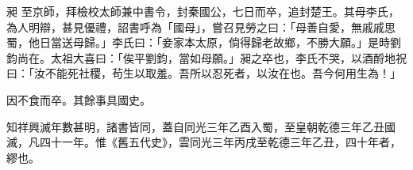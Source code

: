 \begin{pinyinscope}
 昶
 至京師，拜檢校太師兼中書令，封秦國公，七日而卒，追封楚王。其母李氏，為人明辯，甚見優禮，詔書呼為「國母」，嘗召見勞之曰：「母善自愛，無戚戚思蜀，他日當送母歸。」李氏曰：「妾家本太原，倘得歸老故鄉，不勝大願。」是時劉鈞尚在。太祖大喜曰：「俟平劉鈞，當如母願。」昶之卒也，李氏不哭，以酒酹地祝曰：「汝不能死社稷，茍生以取羞。吾所以忍死者，以汝在也。吾今何用生為！」



 因不食而卒。其餘事具國史。



 知祥興滅年數甚明，諸書皆同，蓋自同光三年乙酉入蜀，至皇朝乾德三年乙丑國滅，凡四十一年。惟《舊五代史》，雲同光三年丙戌至乾德三年乙丑，四十年者，繆也。



\end{pinyinscope}